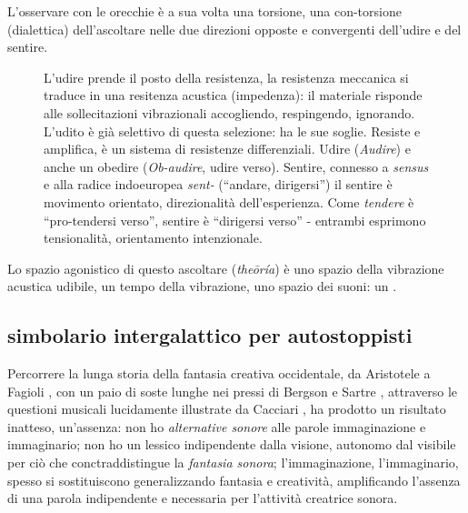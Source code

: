 \documentclass{../../lib/gs}
\begin{document}
L'osservare con le orecchie è a sua volta una torsione, una con-torsione
(dialettica) dell'ascoltare nelle due direzioni opposte e convergenti dell'udire
e del sentire.

\begin{figure}[htbp]
\begin{center}
\caption{L'udire prende il posto della resistenza, la resistenza meccanica si
traduce in una resitenza acustica (impedenza): il materiale risponde alle
sollecitazioni vibrazionali accogliendo, respingendo, ignorando. L'udito è già
selettivo di questa selezione: ha le sue soglie. Resiste e amplifica, è un
sistema di resistenze differenziali. Udire (\emph{Audire}) e anche un obedire
(\emph{Ob-audire}, udire verso). Sentire, connesso a \emph{sensus} e alla radice
indoeuropea \emph{sent-} (“andare, dirigersi”) il sentire è movimento orientato,
direzionalità dell'esperienza. Come \emph{tendere} è “pro-tendersi verso”,
sentire è “dirigersi verso” - entrambi esprimono tensionalità, orientamento
intenzionale.}
\label{ascoltare}
\end{center}
\end{figure}

Lo spazio agonistico \cite{ronchi2001} di questo ascoltare (\emph{theōría}) è
uno spazio della vibrazione acustica udibile, un tempo della vibrazione, uno
spazio dei suoni: un .

\subsection{simbolario intergalattico per autostoppisti}

Percorrere la lunga storia della fantasia creativa occidentale, da Aristotele a
Fagioli \cite{mf:istinto}, con un paio di soste lunghe nei pressi di
Bergson \cite{bergson1896} e Sartre \cite{jps:immaginario}, attraverso le questioni
musicali lucidamente illustrate da Cacciari \cite{Cacciari1995}, ha prodotto un
risultato inatteso, un'assenza: non ho \emph{alternative sonore} alle parole
immaginazione e immaginario; non ho un lessico indipendente dalla visione,
autonomo dal visibile per ciò che conctraddistingue la \emph{fantasia sonora};
l'immaginazione, l'immaginario, spesso si sostituiscono generalizzando fantasia
e creatività, amplificando l'assenza di una parola indipendente e necessaria per
l'attività creatrice sonora.
\end{document}
